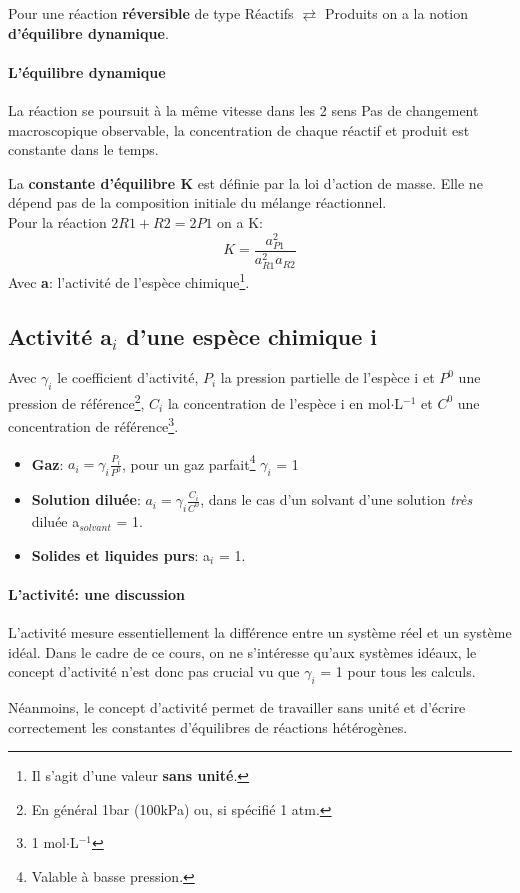 \documentclass[10pt,a4paper]{book}
\begin{document}
Pour une réaction \textbf{réversible} de type Réactifs $\rightleftarrows$ Produits on a la notion \textbf{d'équilibre dynamique}.
\paragraph{L'équilibre dynamique} La réaction se poursuit à la même vitesse dans les 2 sens
Pas de changement macroscopique observable, la concentration de chaque réactif et produit est constante dans le temps. \par
La \textbf{constante d’équilibre K} est définie par la loi d’action de masse. Elle ne dépend pas de la composition initiale du mélange réactionnel. \\
Pour la réaction \(2R1 + R2 = 2P1\) on a K:
\[K = \frac{a_{P1}^2}{a_{R1}^2 a_{R2}}\]
Avec \textbf{a}: l'activité de l'espèce chimique\footnote{Il s'agit d'une valeur \textbf{sans unité}.}.

\subsection{Activité \texorpdfstring{a$_i$}{ai} d'une espèce chimique i}

Avec \textbf{$\gamma_i$} le coefficient d'activité, $P_i$ la pression partielle de l'espèce i et $P^0$ une pression de référence\footnote{En général 1bar (100kPa) ou, si spécifié 1 atm.}, $C_i$ la concentration de l'espèce i en mol$\cdot$L$^{-1}$ et $C^0$ une concentration de référence\footnote{1 mol$\cdot$L$^{-1}$}.
\begin{itemize}
\item \textbf{Gaz}: \(a_i = \gamma_i\frac{P_i}{P^0}\), pour un gaz parfait\footnote{Valable à basse pression.} $\gamma_i$ = 1
\item \textbf{Solution diluée}: \(a_i = \gamma_i\frac{C_i}{C^0}\), dans le cas d'un solvant d'une solution \textit{très} diluée a$_{solvant}$ = 1.
\item \textbf{Solides et liquides purs}: a$_i$ = 1.
\end{itemize}
\paragraph{L'activité: une discussion} L’activité mesure essentiellement la différence entre un système réel et un système idéal. Dans le cadre de ce cours, on ne s'intéresse qu'aux systèmes idéaux, le concept d’activité n’est donc pas crucial vu que $\gamma_i$ = 1 pour tous les calculs. \par
Néanmoins, le concept d'activité permet de travailler sans unité et d'écrire correctement les constantes d'équilibres de réactions hétérogènes.
\end{document}
